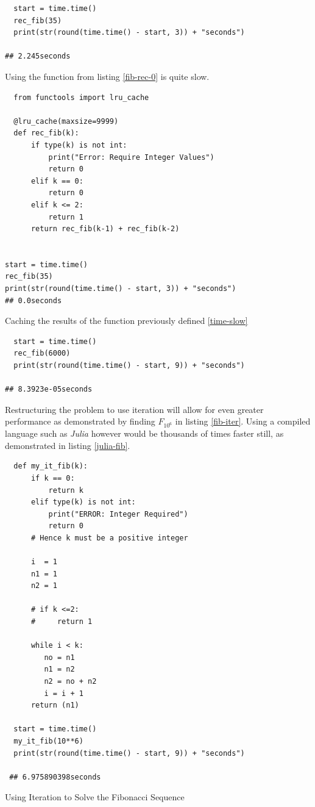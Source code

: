 \documentclass[11pt]{article}
\begin{document}
\begin{listing}[htbp]
\begin{verbatim}
  start = time.time()
  rec_fib(35)
  print(str(round(time.time() - start, 3)) + "seconds")

## 2.245seconds
\end{verbatim}
\caption{\label{time-slow}Using the function from listing \ref{fib-rec-0} is quite slow.}
\end{listing}


\begin{listing}[htbp]
\begin{verbatim}
  from functools import lru_cache

  @lru_cache(maxsize=9999)
  def rec_fib(k):
      if type(k) is not int:
          print("Error: Require Integer Values")
          return 0
      elif k == 0:
          return 0
      elif k <= 2:
          return 1
      return rec_fib(k-1) + rec_fib(k-2)


start = time.time()
rec_fib(35)
print(str(round(time.time() - start, 3)) + "seconds")
## 0.0seconds
\end{verbatim}
\caption{\label{fib-cache}Caching the results of the function previously defined \ref{time-slow}}
\end{listing}

\begin{verbatim}
  start = time.time()
  rec_fib(6000)
  print(str(round(time.time() - start, 9)) + "seconds")

## 8.3923e-05seconds
\end{verbatim}

Restructuring the problem to use iteration will allow for even greater performance as demonstrated by finding \(F_{10^{6}}\) in listing \ref{fib-iter}. Using a compiled language such as \emph{Julia} however would be thousands of times faster still, as demonstrated in listing \ref{julia-fib}.



\begin{listing}[htbp]
\begin{verbatim}
  def my_it_fib(k):
      if k == 0:
          return k
      elif type(k) is not int:
          print("ERROR: Integer Required")
          return 0
      # Hence k must be a positive integer

      i  = 1
      n1 = 1
      n2 = 1

      # if k <=2:
      #     return 1

      while i < k:
         no = n1
         n1 = n2
         n2 = no + n2
         i = i + 1
      return (n1)

  start = time.time()
  my_it_fib(10**6)
  print(str(round(time.time() - start, 9)) + "seconds")

 ## 6.975890398seconds
\end{verbatim}
\caption{\label{fib-iter}Using Iteration to Solve the Fibonacci Sequence}
\end{listing}
\end{document}
